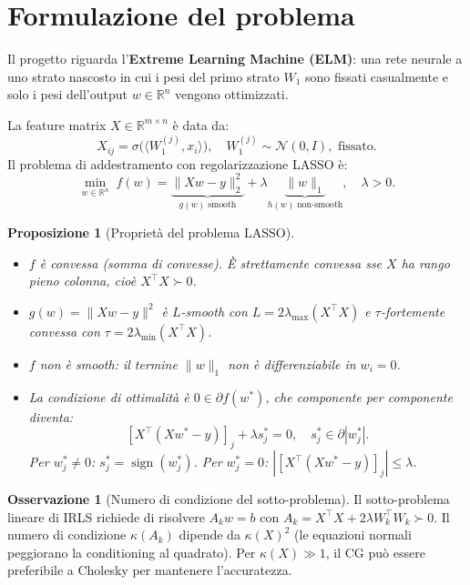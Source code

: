 \documentclass[11pt, a4paper, twoside]{book}
\theoremstyle{definition}
\newtheorem{remark}{Osservazione}[chapter]
\theoremstyle{plain}
\newtheorem{prop}{Proposizione}[chapter]
\theoremstyle{remark}
\DeclareMathOperator{\sign}{sign}
\newcommand{\R}{\mathbb{R}}
\begin{document}
\section{Formulazione del problema}
\label{sec:elm-lasso}

Il progetto riguarda l'\textbf{Extreme Learning Machine (ELM)}: una rete neurale a uno strato
nascosto in cui i pesi del primo strato $W_1$ sono fissati casualmente e solo i pesi
dell'output $w \in \R^n$ vengono ottimizzati.

La feature matrix $X \in \R^{m \times n}$ è data da:
\[
  X_{ij} = \sigma\bigl(\langle W_1^{(j)}, x_i\rangle\bigr), \quad
  W_1^{(j)} \sim \mathcal{N}(0, I), \text{ fissato.}
\]
Il problema di addestramento con regolarizzazione LASSO è:
\begin{equation}
  \label{eq:lasso}
  \min_{w \in \R^n}\; f(w) = \underbrace{\|Xw - y\|_2^2}_{g(w)\;\text{smooth}} + \lambda\underbrace{\|w\|_1}_{h(w)\;\text{non-smooth}},
  \quad \lambda > 0.
\end{equation}

\begin{prop}[Proprietà del problema LASSO]
\begin{itemize}
  \item $f$ è \emph{convessa} (somma di convesse). È \emph{strettamente convessa} sse $X$ ha rango pieno colonna, cioè $X^\top X \succ 0$.
  \item $g(w) = \|Xw - y\|^2$ è $L$-smooth con $L = 2\lambda_{\max}(X^\top X)$ e $\tau$-fortemente convessa con $\tau = 2\lambda_{\min}(X^\top X)$.
  \item $f$ \emph{non è smooth}: il termine $\|w\|_1$ non è differenziabile in $w_i = 0$.
  \item La condizione di ottimalità è $0 \in \partial f(w^*)$, che componente per componente diventa:
        \[
          [X^\top(Xw^* - y)]_j + \lambda s_j^* = 0, \quad s_j^* \in \partial|w_j^*|.
        \]
        Per $w_j^* \neq 0$: $s_j^* = \sign(w_j^*)$. Per $w_j^* = 0$: $|[X^\top(Xw^*-y)]_j| \leq \lambda$.
\end{itemize}
\end{prop}

\begin{remark}[Numero di condizione del sotto-problema]
Il sotto-problema lineare di IRLS richiede di risolvere $A_k w = b$ con $A_k = X^\top X + 2\lambda W_k^\top W_k \succ 0$.
Il numero di condizione $\kappa(A_k)$ dipende da $\kappa(X)^2$ (le equazioni normali peggiorano la conditioning al quadrato). Per $\kappa(X) \gg 1$, il CG può essere preferibile a Cholesky per mantenere l'accuratezza.
\end{remark}
\end{document}
